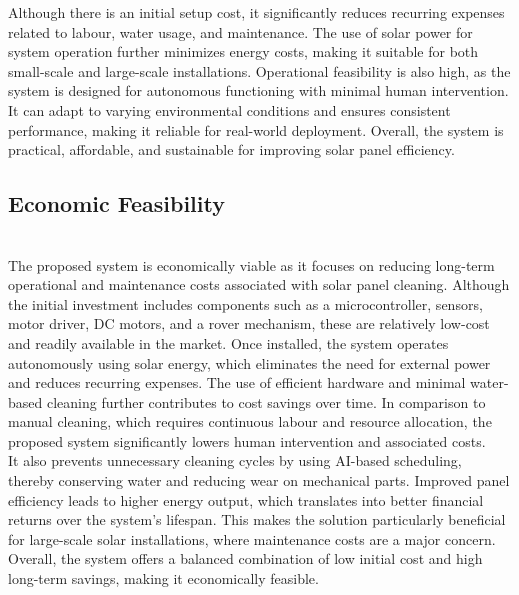 \documentclass[10pt]{report}
\begin{document}
\begin{sloppypar}
{{{\begin{sloppypar}
Although there is an initial
setup cost, it significantly reduces recurring expenses related to labour, water usage,
and maintenance. The use of solar power for system operation further minimizes
energy costs, making it suitable for both small-scale and large-scale installations.
Operational feasibility is also high, as the system is designed for autonomous functioning with minimal human intervention. It can adapt to varying environmental
conditions and ensures consistent performance, making it reliable for real-world deployment. Overall, the system is practical, affordable, and sustainable for improving
solar panel efficiency.\\
\subsection{Economic Feasibility}\\
\hspace{0.5cm}
The proposed system is economically viable as it focuses on reducing long-term
operational and maintenance costs associated with solar panel cleaning. Although
the initial investment includes components such as a microcontroller, sensors, motor
driver, DC motors, and a rover mechanism, these are relatively low-cost and readily available in the market. Once installed, the system operates autonomously using
solar energy, which eliminates the need for external power and reduces recurring
expenses. The use of efficient hardware and minimal water-based cleaning further
contributes to cost savings over time. In comparison to manual cleaning, which requires continuous labour and resource allocation, the proposed system significantly
lowers human intervention and associated costs.\\

 It also prevents unnecessary cleaning cycles by using AI-based scheduling, thereby conserving water and reducing
wear on mechanical parts. Improved panel efficiency leads to higher energy output,
which translates into better financial returns over the system’s lifespan. This makes
the solution particularly beneficial for large-scale solar installations, where maintenance costs are a major concern. Overall, the system offers a balanced combination
of low initial cost and high long-term savings, making it economically feasible.\\


\end{sloppypar}}}}
\end{sloppypar}
\end{document}
